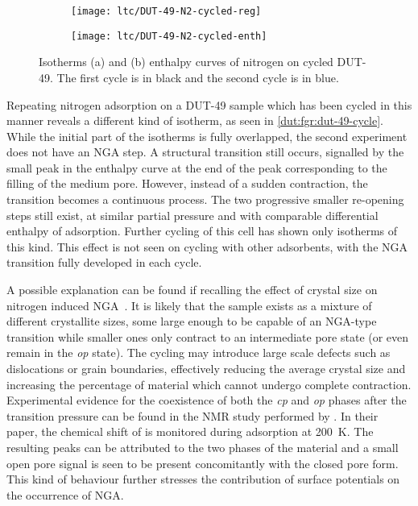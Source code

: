 \begin{figure}[htb]
    \centering
    \begin{subfigure}[c]{0.5\linewidth}
        \texttt{[image: ltc/DUT-49-N2-cycled-reg]}%
        \caption{}\label{dut:fgr:dut-49-cycle-reg}
    \end{subfigure}%
    \begin{subfigure}[h]{0.5\linewidth}
        \centering
        \texttt{[image: ltc/DUT-49-N2-cycled-enth]}%
        \caption{}\label{dut:fgr:dut-49-cycle-enth}
    \end{subfigure}%
    \caption{Isotherms (a) and (b) enthalpy curves of nitrogen on
    cycled DUT-49. The first cycle is in black and the second 
    cycle is in blue.}%
    \label{dut:fgr:dut-49-cycle}
\end{figure}

Repeating nitrogen adsorption on a DUT-49 sample which has been
cycled in this manner reveals a different kind of isotherm, 
as seen in \autoref{dut:fgr:dut-49-cycle}. While the initial 
part of the isotherms is fully overlapped,
the second experiment does not have an NGA step. 
A structural transition still occurs, 
signalled by the small peak in the enthalpy curve at the end of the 
peak corresponding to the filling of the medium pore. However, instead
of a sudden contraction, the transition becomes a continuous 
process. The two progressive smaller re-opening steps still exist,
at similar partial pressure and with comparable differential enthalpy
of adsorption. Further cycling of this cell has shown only isotherms
of this kind. This effect is not seen on cycling with other 
adsorbents, with the NGA transition fully developed in each cycle. 

A possible explanation can be found if recalling the effect 
of crystal size on nitrogen induced 
NGA~\cite{krauseEffectCrystalliteSize2018}. It is likely 
that the sample exists as a mixture of different crystallite
sizes, some large enough to be capable of an NGA-type transition 
while smaller ones only contract to an intermediate pore state
(or even remain in the \textit{op} state).
The cycling may introduce large scale defects such as dislocations
or grain boundaries, effectively reducing the average crystal size
and increasing the percentage of material which cannot undergo 
complete contraction. 
Experimental evidence for the coexistence of both the \textit{cp} and 
\textit{op} phases after the transition pressure can be found in the 
 NMR study performed 
by \citet{schaberSituMonitoringUnique2017}. In their paper,
the chemical shift of  is monitored during
adsorption at \SI{200}{\kelvin}. The resulting peaks can be attributed
to the two phases of the material and a small
open pore signal is seen to be present concomitantly with the 
closed pore form.
This kind of behaviour further stresses the 
contribution of surface potentials on the occurrence of NGA.
